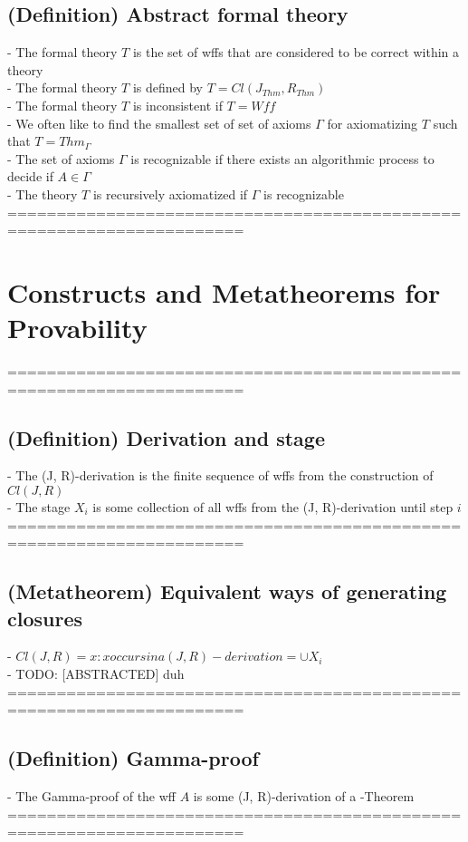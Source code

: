 \documentclass{article}
\begin{document}
\subsection{(Definition) Abstract formal theory}
	- The formal theory $T$ is the set of wffs that are considered to be correct within a theory \\
	- The formal theory $T$ is defined by $T = Cl(J_{Thm}, R_{Thm})$ \\
	- The formal theory $T$ is inconsistent if $T = Wff$ \\
	- We often like to find the smallest set of set of axioms $\Gamma$ for axiomatizing $T$ such that $T = Thm_\Gamma$ \\
	- The set of axioms $\Gamma$ is recognizable if there exists an algorithmic process to decide if $A \in \Gamma$ \\
	- The theory $T$ is recursively axiomatized if $\Gamma$ is recognizable \\
	======================================================================

\section{Constructs and Metatheorems for Provability}
	======================================================================
\subsection{(Definition) Derivation and stage}
	- The (J, R)-derivation is the finite sequence of wffs from the construction of $Cl(J, R)$ \\
	- The stage $X_i$ is some collection of all wffs from the (J, R)-derivation until step $i$ \\
	======================================================================
\subsection{(Metatheorem) Equivalent ways of generating closures}
	- $Cl(J, R) = {x: x occurs in a (J, R)-derivation} = \cup X_i$ \\
	- TODO: [ABSTRACTED] duh
	======================================================================
\subsection{(Definition) Gamma-proof}
	- The Gamma-proof of the wff $A$ is some (J, R)-derivation of a \Gamma-Theorem
	======================================================================
\end{document}

